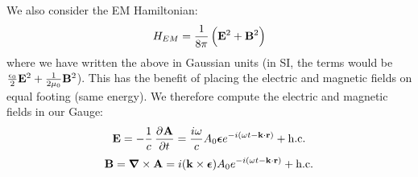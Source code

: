 We also consider the EM Hamiltonian:
\begin{equation}
    H_{EM} = \frac{1}{8\pi}\left(\mathbf{E}^2 + \mathbf{B}^2\right)
\end{equation}
where we have written the above in Gaussian units (in SI, the terms would be $\frac{\epsilon_0}{2}\mathbf{E}^2 + \frac{1}{2\mu_0}\mathbf{B}^2$). This has the benefit of placing the electric and magnetic fields on equal footing (same energy). We therefore compute the electric and magnetic fields in our Gauge:
\begin{equation}
    \v{E} = -\frac{1}{c}\dpd{\v{A}}{t} = \frac{i\omega}{c}A_0\gv{\e}e^{-i(\omega t - \v{k} \cdot \v{r})} + \text{h.c.}
\end{equation}
\begin{equation}
    \v{B} = \nabla \times \v{A} = i(\v{k} \times \gv{\e})A_0e^{-i(\omega t - \v{k} \cdot \v{r})} + \text{h.c.}
\end{equation}

